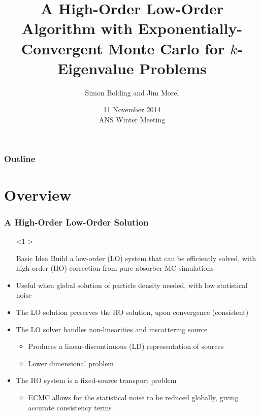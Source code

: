 \documentclass[xcolor=dvipsnames,handout]{beamer}
\title{A High-Order Low-Order Algorithm with Exponentially-Convergent Monte Carlo for
    $k$-Eigenvalue Problems}
\author{{\large Simon Bolding and Jim Morel}}
\date{11 November 2014 \\ \vspace{0.05in} {ANS Winter Meeting}}
\newcommand{\colb}[1]{{\color{blue} #1}}
\newlength{\wideitemsep}
\let\olditem\item
\renewcommand{\item}{\setlength{\itemsep}{\wideitemsep}\olditem}
\begin{document}
\begin{frame}
    \titlepage \vspace{-0.213in}
    \begin{center}
    \end{center}    
\end{frame}

\setlength{\tabcolsep}{6pt}

\begin{frame}
\frametitle{Outline}
\begin{minipage}{0.061\linewidth}
\hfill                      
\end{minipage}
\begin{minipage}{0.8\linewidth}
\tableofcontents[
hideothersubsections,
sectionstyle=show,
subsectionstyle=hide
]
\end{minipage}

\end{frame}


\section{Overview}


\begin{frame}
    \frametitle{A High-Order Low-Order Solution}
        \begin{itemize}
            \item[]<1-> \begin{block}{Basic Idea} Build a low-order (LO) system that can be efficiently solved,
                with high-order (HO) correction from pure absorber MC simulations \end{block}
                \vspace{-0.1in}
              \item Useful when global solution of particle density needed, with low
                  statistical noise
              \item<1-> The LO solution
                  preserves the HO solution, upon 
                  convergence (consistent)
              \item<2-> The LO solver handles non-linearities and inscattering source
                \begin{itemize}
                    \item<2-> Produces a linear-discontinuous (LD) representation of sources
                    \item<2-> Lower \colb{dimensional} problem
                \end{itemize}

            \item<3-> The HO system is a fixed-source transport problem
                \begin{itemize}
                    \item<3-> ECMC allows for the statistical noise to be reduced
                        globally, giving accurate consistency terms
                \end{itemize}
        \end{itemize}
\end{frame}
\end{document}
